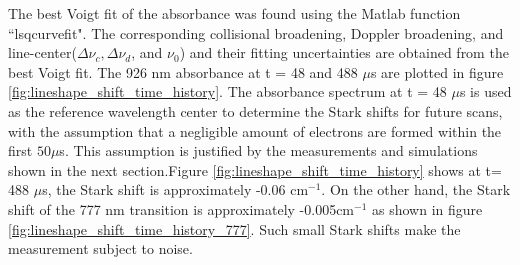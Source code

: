 \documentclass[12pt]{iopart}
\begin{document}
The best Voigt fit of the absorbance  was found using the Matlab function ``lsqcurvefit". The corresponding collisional broadening, Doppler broadening, and line-center($\Delta \nu_c,\Delta \nu_d$, and $\nu_0$) and their fitting uncertainties are obtained from the best Voigt fit. The 926 nm absorbance at t = 48 and 488 $\mu$s are plotted in figure \ref{fig:lineshape_shift_time_history}. The absorbance spectrum at t = 48 $\mu$s is used as the reference wavelength center to determine the Stark shifts for future scans, with the assumption that a negligible amount of electrons are formed within the first $50 \mu$s. This assumption is justified by the measurements and simulations shown in the next section.Figure \ref{fig:lineshape_shift_time_history} shows at t= 488 $\mu$s, the Stark shift is approximately -0.06 cm$^{-1}$. On the other hand, the Stark shift of the 777 nm transition is approximately -0.005cm$^{-1}$ as shown in figure \ref{fig:lineshape_shift_time_history_777}. Such small Stark shifts make the measurement subject to noise.
\end{document}
